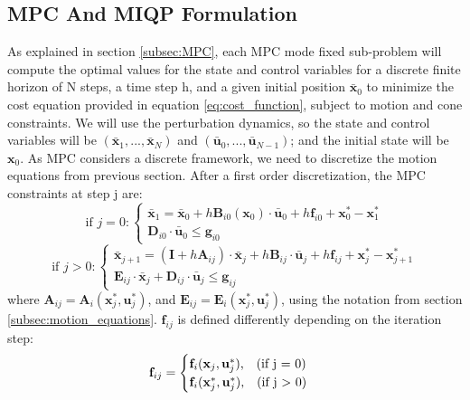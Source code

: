 \documentclass[12,twoside]{TFG-GM}
\theoremstyle{definition}
\theoremstyle{remark}
\newcommand*\diff[1]{\bar{#1}}
\begin{document}
\subsection{MPC And MIQP Formulation} \label{subsec:mpc_formulation}

As explained in section \ref{subsec:MPC}, each MPC mode fixed sub-problem will compute the optimal values for the state and control variables for a discrete finite horizon of N steps, a time step h, and a given initial position $\diff{\textbf{x}}_0$ to minimize the cost equation provided in equation \ref{eq:cost_function}, subject to motion and cone constraints. We will use the perturbation dynamics, so the state and control variables will be $(\diff{\textbf{x}}_1, ..., \diff{\textbf{x}}_N)$ and $(\diff{\textbf{u}}_0, ..., \diff{\textbf{u}}_{N-1})$; and the initial state will be $\textbf{x}_0$. As MPC considers a discrete framework, we need to discretize the motion equations from previous section. After a first order discretization, the MPC constraints at step j are:
\begin{equation} \label{eq:mpc_constraints_initial_step}
\text{if } j = 0: \begin{cases}
\diff{\textbf{x}}_1 = \diff{\textbf{x}}_0 +  h \textbf{B}_{i0}(\textbf{x}_0) \cdot \diff{\textbf{u}}_0 + h \textbf{f}_{i0} + \textbf{x}_0^* - \textbf{x}_1^*\\
\textbf{D}_{i0} \cdot \diff{\textbf{u}}_0 \leq \textbf{g}_{i0}
\end{cases}
\end{equation}
\begin{equation} \label{eq:mpc_constraints_non_initial_step}
\text{if } j > 0: \begin{cases}
\diff{\textbf{x}}_{j+1} = (\textbf{I} + h \textbf{A}_{ij})\cdot \diff{\textbf{x}}_j + h \textbf{B}_{ij} \cdot \diff{\textbf{u}}_j + h \textbf{f}_{ij}  + \textbf{x}_{j}^* - \textbf{x}_{j+1}^*\\
\textbf{E}_{ij} \cdot \diff{\textbf{x}}_j + \textbf{D}_{ij} \cdot \diff{\textbf{u}}_j \leq \textbf{g}_{ij}
\end{cases}
\end{equation}
where $\textbf{A}_{ij} = \textbf{A}_i(\textbf{x}_j^*, \textbf{u}_j^*)$, and $\textbf{E}_{ij} = \textbf{E}_i(\textbf{x}_j^*, \textbf{u}_j^*)$, using the notation from section \ref{subsec:motion_equations}. $\textbf{f}_{ij}$ is defined differently depending on the iteration step:
$$ \textbf{f}_{ij} = \begin{cases} \textbf{f}_{i}(\textbf{x}_j, \textbf{u}_j^*)\text{,  \,\,\,\,(if j = 0)} \\
\textbf{f}_{i}(\textbf{x}_j^*, \textbf{u}_j^*) \text{, \,\,\,\,(if j $>$ 0)} 
\end{cases}$$
\end{document}
